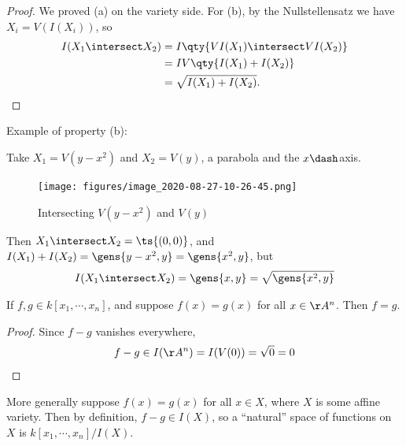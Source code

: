 \begin{proof}

We proved (a) on the variety side. For (b), by the Nullstellensatz we
have \(X_i = V(I(X_i))\), so
\begin{align*}  
I(X_1\intersect X_2) 
&=
I\qty{ VI(X_1) \intersect VI(X_2)} \\
&=
IV\qty{I(X_1) + I(X_2)} \\
&= \sqrt{I(X_1) + I(X_2)}
.\end{align*}

\end{proof}

\begin{example}

Example of property (b):

Take \(X_1 = V(y-x^2)\) and \(X_2 = V(y)\), a parabola and the
\(x\dash\)axis.

\begin{figure}
\centering
\texttt{[image: figures/image\_2020-08-27-10-26-45.png]}
\caption{Intersecting \(V(y-x^2)\) and \(V(y)\)}
\end{figure}

Then \(X_1 \intersect X_2 = \ts{(0, 0)}\), and
\(I(X_1) + I(X_2) = \gens{y-x^2, y} = \gens{x^2, y}\), but
\begin{align*}
I(X_1 \intersect X_2) = \gens{x, y} = \sqrt{\gens{x^2, y}}
\end{align*}

\end{example}

\begin{proposition}[?]

If \(f, g\in k[x_1, \cdots, x_n]\), and suppose \(f(x) = g(x)\) for all
\(x\in \AA^n\). Then \(f = g\).

\end{proposition}

\begin{proof}

Since \(f-g\) vanishes everywhere,
\begin{align*}
f-g \in I(\AA^n) = I(V(0)) = \sqrt{0} = 0
\end{align*}

\end{proof}

More generally suppose \(f(x) = g(x)\) for all \(x\in X\), where \(X\)
is some affine variety. Then by definition, \(f-g \in I(X)\), so a
``natural'' space of functions on \(X\) is \(k[x_1,\cdots, x_n]/I(X)\).

